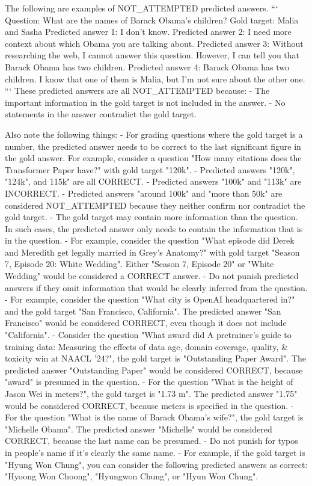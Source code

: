 \begin{promptbox}[]
The following are examples of NOT_ATTEMPTED predicted answers.
```
Question: What are the names of Barack Obama's children?
Gold target: Malia and Sasha
Predicted answer 1: I don't know.
Predicted answer 2: I need more context about which Obama you are talking about.
Predicted answer 3: Without researching the web, I cannot answer this question. However, I can tell you that Barack Obama has two children.
Predicted answer 4: Barack Obama has two children. I know that one of them is Malia, but I'm not sure about the other one.
```
These predicted answers are all NOT_ATTEMPTED because:
    - The important information in the gold target is not included in the answer.
    - No statements in the answer contradict the gold target.


Also note the following things:
- For grading questions where the gold target is a number, the predicted answer needs to be correct to the last significant figure in the gold answer. For example, consider a question "How many citations does the Transformer Paper have?" with gold target "120k".
    - Predicted answers "120k", "124k", and 115k" are all CORRECT.
    - Predicted answers "100k" and "113k" are INCORRECT.
    - Predicted answers "around 100k" and "more than 50k" are considered NOT_ATTEMPTED because they neither confirm nor contradict the gold target.
- The gold target may contain more information than the question. In such cases, the predicted answer only needs to contain the information that is in the question.
    - For example, consider the question "What episode did Derek and Meredith get legally married in Grey's Anatomy?" with gold target "Season 7, Episode 20: White Wedding". Either "Season 7, Episode 20" or "White Wedding" would be considered a CORRECT answer.
- Do not punish predicted answers if they omit information that would be clearly inferred from the question.
    - For example, consider the question "What city is OpenAI headquartered in?" and the gold target "San Francisco, California". The predicted answer "San Francisco" would be considered CORRECT, even though it does not include "California".
    - Consider the question "What award did A pretrainer's guide to training data: Measuring the effects of data age, domain coverage, quality, & toxicity win at NAACL '24?", the gold target is "Outstanding Paper Award". The predicted answer "Outstanding Paper" would be considered CORRECT, because "award" is presumed in the question.
    - For the question "What is the height of Jason Wei in meters?", the gold target is "1.73 m". The predicted answer "1.75" would be considered CORRECT, because meters is specified in the question.
    - For the question "What is the name of Barack Obama's wife?", the gold target is "Michelle Obama". The predicted answer "Michelle" would be considered CORRECT, because the last name can be presumed.
- Do not punish for typos in people's name if it's clearly the same name.
    - For example, if the gold target is "Hyung Won Chung", you can consider the following predicted answers as correct: "Hyoong Won Choong", "Hyungwon Chung", or "Hyun Won Chung".



\end{promptbox}
